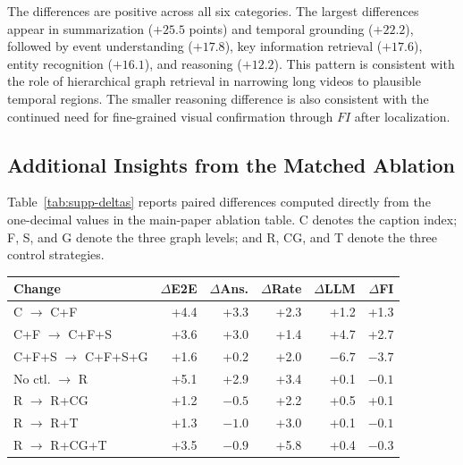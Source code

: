 \documentclass[letterpaper]{article}
\begin{document}
The differences are positive across all six categories.
The largest differences appear in summarization ($+25.5$ points) and temporal grounding ($+22.2$), followed by event understanding ($+17.8$), key information retrieval ($+17.6$), entity recognition ($+16.1$), and reasoning ($+12.2$).
This pattern is consistent with the role of hierarchical graph retrieval in narrowing long videos to plausible temporal regions.
The smaller reasoning difference is also consistent with the continued need for fine-grained visual confirmation through $FI$ after localization.

\subsection{Additional Insights from the Matched Ablation}

Table~\ref{tab:supp-deltas} reports paired differences computed directly from the one-decimal values in the main-paper ablation table.
C denotes the caption index; F, S, and G denote the three graph levels; and R, CG, and T denote the three control strategies.

\begin{center}
  \centering
  \small
  \setlength{\tabcolsep}{2.5pt}
  \begin{tabular}{@{}lrrrrr@{}}
    \toprule
    \textbf{Change} &
    \textbf{$\Delta$E2E} &
    \textbf{$\Delta$Ans.} &
    \textbf{$\Delta$Rate} &
    \textbf{$\Delta$LLM} &
    \textbf{$\Delta$FI} \\
    \midrule
    C $\rightarrow$ C+F                 & +4.4 & +3.3 & +2.3 & +1.2 & +1.3 \\
    C+F $\rightarrow$ C+F+S             & +3.6 & +3.0 & +1.4 & +4.7 & +2.7 \\
    C+F+S $\rightarrow$ C+F+S+G          & +1.6 & +0.2 & +2.0 & $-6.7$ & $-3.7$ \\
    \midrule
    No ctl. $\rightarrow$ R              & +5.1 & +2.9 & +3.4 & +0.1 & $-0.1$ \\
    R $\rightarrow$ R+CG                & +1.2 & $-0.5$ & +2.2 & +0.5 & +0.1 \\
    R $\rightarrow$ R+T                 & +1.3 & $-1.0$ & +3.0 & +0.1 & $-0.1$ \\
    R $\rightarrow$ R+CG+T              & +3.5 & $-0.9$ & +5.8 & +0.4 & $-0.3$ \\
    \bottomrule
  \end{tabular}
  \label{tab:supp-deltas}
\end{center}
\end{document}
